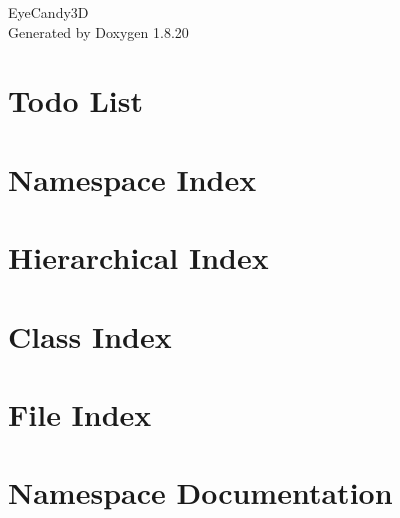 \let\mypdfximage\pdfximage\def\pdfximage{\immediate\mypdfximage}\documentclass[twoside]{book}
\newcommand{\+}{\discretionary{\mbox{\scriptsize$\hookleftarrow$}}{}{}}
\newcommand{\clearemptydoublepage}{%
  \newpage{\pagestyle{empty}\cleardoublepage}%
}
\begin{document}
\hypersetup{pageanchor=false,
             bookmarksnumbered=true,
             pdfencoding=unicode
            }
\begin{titlepage}
\vspace*{7cm}
\begin{center}%
{\Large Eye\+Candy3D }\\
\vspace*{1cm}
{\large Generated by Doxygen 1.8.20}\\
\end{center}
\end{titlepage}
\clearemptydoublepage
{}
\tableofcontents
\clearemptydoublepage
{}
\hypersetup{pageanchor=true}

\chapter{Todo List}
\label{todo}

\chapter{Namespace Index}

\chapter{Hierarchical Index}

\chapter{Class Index}

\chapter{File Index}

\chapter{Namespace Documentation}




\end{document}
